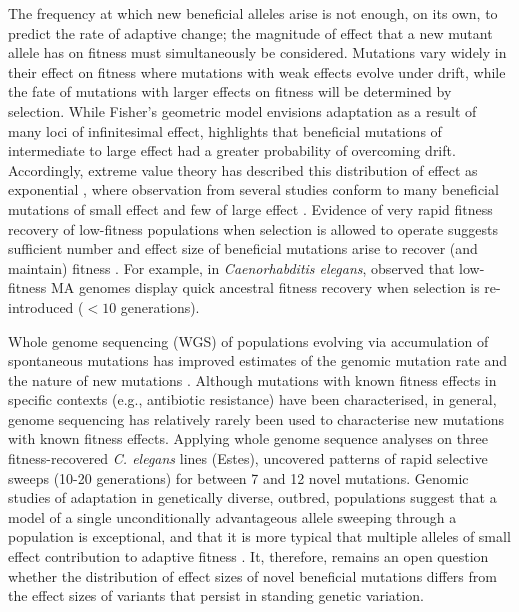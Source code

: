 The frequency at which new beneficial alleles arise is not enough, on its own, to predict the rate of adaptive change; the magnitude of effect that a new mutant allele has on fitness must simultaneously be considered. Mutations vary widely in their effect on fitness \citep{Eyre07, Wals18} where mutations with weak effects \citep[$s < 1/2N_e$, where $s$ is the selection coefficient and $N_e$ is the effective population size][]{Wrig31, Kimu83} evolve under drift, while the fate of mutations with larger effects on fitness will be determined by selection. While Fisher’s geometric model envisions adaptation as a result of many loci of infinitesimal effect, \citet{Kimu83} highlights that beneficial mutations of intermediate to large effect had a greater probability of overcoming drift. Accordingly, extreme value theory has described this distribution of effect as exponential \citep{Gill84, Orr03}, where observation from several studies conform to many beneficial mutations of small effect and few of large effect \citep{Imho01, Kass06, Burc07, Bata11}. Evidence of very rapid fitness recovery of low-fitness populations when selection is allowed to operate suggests sufficient number and effect size of beneficial mutations arise to recover (and maintain) fitness \citep{Burc99, Este03, Este11, Szam14}. For example, in \textit{Caenorhabditis elegans}, \citet{Este03} observed that low-fitness MA genomes display quick ancestral fitness recovery when selection is re-introduced ($< 10$ generations).\par

Whole genome sequencing (WGS) of populations evolving via accumulation of spontaneous mutations has improved estimates of the genomic mutation rate and the nature of new mutations \citep[reviewed by][]{Katj19}. Although mutations with known fitness effects in specific contexts (e.g., antibiotic resistance) have been characterised, in general, genome sequencing has relatively rarely been used to characterise new mutations with known fitness effects. Applying whole genome sequence analyses on three fitness-recovered \textit{C. elegans} lines (Estes), \citet{Denv10} uncovered patterns of rapid selective sweeps (10-20 generations) for between 7 and 12 novel mutations. Genomic studies of adaptation in genetically diverse, outbred, populations suggest that a model of a single unconditionally advantageous allele sweeping through a population is exceptional, and that it is more typical that multiple alleles of small effect contribution to adaptive fitness \citep{Prit10, Barg19}. It, therefore, remains an open question whether the distribution of effect sizes of novel beneficial mutations differs from the effect sizes of variants that persist in standing genetic variation. \par

